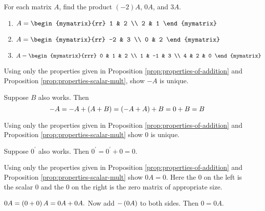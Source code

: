 \begin{enumialphparenastyle}

\begin{ex} For each matrix $A$, find the product $(-2)A$, $0A$, and $3A$. 
\begin{enumerate}
\item
$A = \begin{mymatrix}{rr}
1 & 2 \\
2 & 1 
\end{mymatrix}$

\item
$A = \begin{mymatrix}{rr}
-2 & 3 \\
0 & 2 
\end{mymatrix}$

\item
$A = \begin{mymatrix}{rrr}
0 & 1 & 2 \\
1 & -1 & 3 \\
4 & 2 & 0 
\end{mymatrix}$
\end{enumerate}
\end{ex}

\begin{ex} \label{add-inv-rst-unique} Using only the properties given in Proposition \ref{prop:properties-of-addition}
 and Proposition \ref{prop:properties-scalar-mult}, 
show $-A$ is unique.
\begin{sol}
 Suppose $B$ also works. Then
\[
-A=-A+\left(A+B\right) =\left(-A+A\right) +B=0+B=B
\]
\end{sol}
\end{ex}

\begin{ex} Using only the properties given in Proposition \ref{prop:properties-of-addition} 
and Proposition \ref{prop:properties-scalar-mult}
show $0$ is unique. 
\begin{sol}
Suppose $0^{\prime }$ also works. Then $0^{\prime }=0^{\prime }+0=0.$
\end{sol}
\end{ex}

\begin{ex} Using only the properties given in Proposition \ref{prop:properties-of-addition}
 and Proposition \ref{prop:properties-scalar-mult} show $0A=0.$ Here
the $0$ on the left is the scalar $0$ and the $0$ on the right is the zero matrix of appropriate size.
\begin{sol}
$0A=\left(0+0\right) A=0A+0A.$ Now add $-\left(
0A\right) $ to both sides. Then $0=0A$.
\end{sol}
\end{ex}


\end{enumialphparenastyle}
